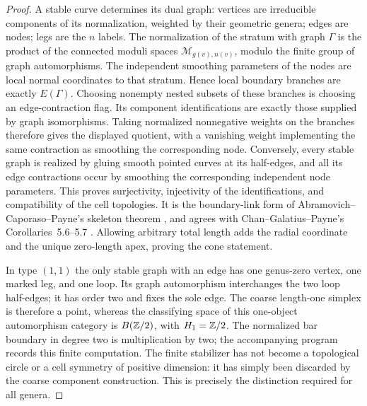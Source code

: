 \begin{proof}
A stable curve determines its dual graph: vertices are irreducible components of its normalization, weighted by their geometric genera; edges are nodes; legs are the $n$ labels.  The normalization of the stratum with graph $\Gamma$ is the product of the connected moduli spaces $\mathcal M_{g(v),n(v)}$, modulo the finite group of graph automorphisms.  The independent smoothing parameters of the nodes are local normal coordinates to that stratum.  Hence local boundary branches are exactly $E(\Gamma)$.  Choosing nonempty nested subsets of these branches is choosing an edge-contraction flag.  Its component identifications are exactly those supplied by graph isomorphisms.  Taking normalized nonnegative weights on the branches therefore gives the displayed quotient, with a vanishing weight implementing the same contraction as smoothing the corresponding node.  Conversely, every stable graph is realized by gluing smooth pointed curves at its half-edges, and all its edge contractions occur by smoothing the corresponding independent node parameters.  This proves surjectivity, injectivity of the identifications, and compatibility of the cell topologies.  It is the boundary-link form of Abramovich--Caporaso--Payne's skeleton theorem \cite[Theorem~1.2.1]{ACP2015}, and agrees with Chan--Galatius--Payne's Corollaries~5.6--5.7 \cite{CGP2021}.  Allowing arbitrary total length adds the radial coordinate and the unique zero-length apex, proving the cone statement.

In type $(1,1)$ the only stable graph with an edge has one genus-zero vertex, one marked leg, and one loop.  Its graph automorphism interchanges the two loop half-edges; it has order two and fixes the sole edge.  The coarse length-one simplex is therefore a point, whereas the classifying space of this one-object automorphism category is $B(\mathbb Z/2)$, with $H_1=\mathbb Z/2$.  The normalized bar boundary in degree two is multiplication by two; the accompanying program records this finite computation.  The finite stabilizer has not become a topological circle or a cell symmetry of positive dimension: it has simply been discarded by the coarse component construction.  This is precisely the distinction required for all genera.
\end{proof}

